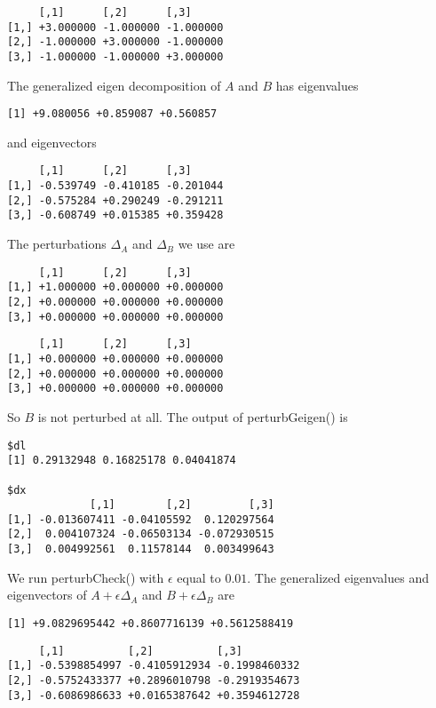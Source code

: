 \documentclass[
  12pt,
  letterpaper,
  DIV=11,
  numbers=noendperiod]{scrartcl}
\begin{document}
\begin{verbatim}
     [,1]      [,2]      [,3]     
[1,] +3.000000 -1.000000 -1.000000
[2,] -1.000000 +3.000000 -1.000000
[3,] -1.000000 -1.000000 +3.000000
\end{verbatim}

The generalized eigen decomposition of \(A\) and \(B\) has eigenvalues

\begin{verbatim}
[1] +9.080056 +0.859087 +0.560857
\end{verbatim}

and eigenvectors

\begin{verbatim}
     [,1]      [,2]      [,3]     
[1,] -0.539749 -0.410185 -0.201044
[2,] -0.575284 +0.290249 -0.291211
[3,] -0.608749 +0.015385 +0.359428
\end{verbatim}

The perturbations \(\Delta_A\) and \(\Delta_B\) we use are

\begin{verbatim}
     [,1]      [,2]      [,3]     
[1,] +1.000000 +0.000000 +0.000000
[2,] +0.000000 +0.000000 +0.000000
[3,] +0.000000 +0.000000 +0.000000
\end{verbatim}

\begin{verbatim}
     [,1]      [,2]      [,3]     
[1,] +0.000000 +0.000000 +0.000000
[2,] +0.000000 +0.000000 +0.000000
[3,] +0.000000 +0.000000 +0.000000
\end{verbatim}

So \(B\) is not perturbed at all. The output of perturbGeigen() is

\begin{verbatim}
$dl
[1] 0.29132948 0.16825178 0.04041874

$dx
             [,1]        [,2]         [,3]
[1,] -0.013607411 -0.04105592  0.120297564
[2,]  0.004107324 -0.06503134 -0.072930515
[3,]  0.004992561  0.11578144  0.003499643
\end{verbatim}

We run perturbCheck() with \(\epsilon\) equal to \(0.01\). The
generalized eigenvalues and eigenvectors of \(A+\epsilon\Delta_A\) and
\(B+\epsilon\Delta_B\) are

\begin{verbatim}
[1] +9.0829695442 +0.8607716139 +0.5612588419
\end{verbatim}

\begin{verbatim}
     [,1]          [,2]          [,3]         
[1,] -0.5398854997 -0.4105912934 -0.1998460332
[2,] -0.5752433377 +0.2896010798 -0.2919354673
[3,] -0.6086986633 +0.0165387642 +0.3594612728
\end{verbatim}
\end{document}
